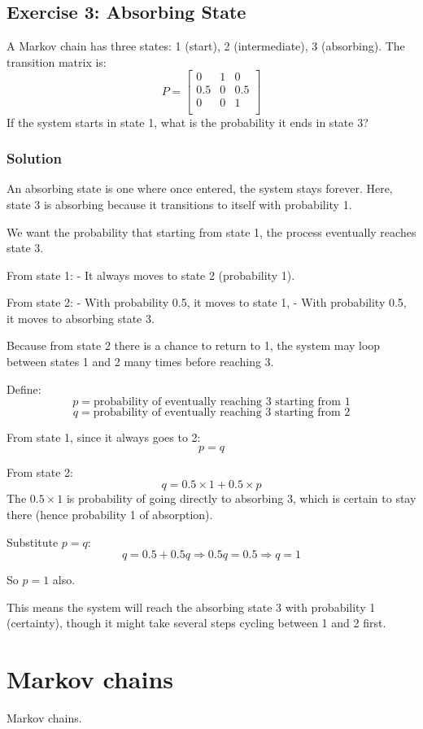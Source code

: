 \documentclass{book}
\begin{document}
\subsection*{Exercise 3: Absorbing State}
A Markov chain has three states: 1 (start), 2 (intermediate), 3 (absorbing). The transition matrix is:
\[
P = \begin{bmatrix}
0 & 1 & 0 \\
0.5 & 0 & 0.5 \\
0 & 0 & 1 \\
\end{bmatrix}
\]
If the system starts in state 1, what is the probability it ends in state 3?

\subsubsection*{Solution}
An absorbing state is one where once entered, the system stays forever. Here, state 3 is absorbing because it transitions to itself with probability 1.

We want the probability that starting from state 1, the process eventually reaches state 3.

From state 1:
- It always moves to state 2 (probability 1).

From state 2:
- With probability 0.5, it moves to state 1,
- With probability 0.5, it moves to absorbing state 3.

Because from state 2 there is a chance to return to 1, the system may loop between states 1 and 2 many times before reaching 3.

Define:
\[
p = \text{probability of eventually reaching 3 starting from 1}
\]
\[
q = \text{probability of eventually reaching 3 starting from 2}
\]

From state 1, since it always goes to 2:
\[
p = q
\]

From state 2:
\[
q = 0.5 \times 1 + 0.5 \times p
\]
The $0.5 \times 1$ is probability of going directly to absorbing 3, which is certain to stay there (hence probability 1 of absorption).

Substitute $p = q$:
\[
q = 0.5 + 0.5 q
\Rightarrow 0.5 q = 0.5
\Rightarrow q = 1
\]

So $p = 1$ also.

This means the system will reach the absorbing state 3 with probability 1 (certainty), though it might take several steps cycling between 1 and 2 first.

\newpage

\section{Markov chains}
Markov chains.
\end{document}
